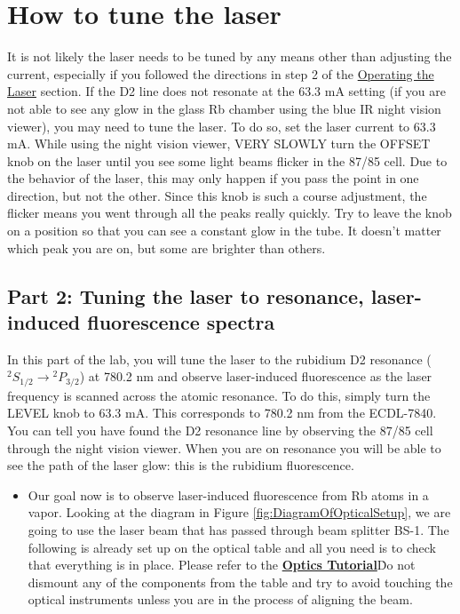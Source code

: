 \documentclass{../lab}
\begin{document}
\newpage

\section{How to tune the laser}

It is not likely the laser needs to be tuned by any means other than adjusting the current, especially if you followed the directions in step 2 of the \hyperref[subsubsec:OperatingTheLaser]{Operating the Laser} section. If the D2 line does not resonate at the 63.3 mA setting (if you are not able to see any glow in the glass Rb chamber using the blue IR night vision viewer), you may need to tune the laser. To do so, set the laser current to 63.3 mA. While using the night vision viewer, VERY SLOWLY turn the OFFSET knob on the laser until you see some light beams flicker in the 87/85 cell. Due to the behavior of the laser, this may only happen if you pass the point in one direction, but not the other. Since this knob is such a course adjustment, the flicker means you went through all the peaks really quickly. Try to leave the knob on a position so that you can see a constant glow in the tube. It doesn't matter which peak you are on, but some are brighter than others.

\subsection{Part 2: Tuning the laser to resonance, laser-induced fluorescence spectra}

In this part of the lab, you will tune the laser to the rubidium D2 resonance ($^2S_{1/2} \rightarrow {}^2P_{3/2}$)  at 780.2 nm and observe laser-induced fluorescence as the laser frequency is scanned across the atomic resonance. To do this, simply turn the LEVEL knob to 63.3 mA. This corresponds to 780.2 nm from the ECDL-7840. You can tell you have found the D2 resonance line by observing the 87/85 cell through the night vision viewer. When you are on resonance you will be able to see the path of the laser glow: this is the rubidium fluorescence.

\begin{itemize}
    \item Our goal now is to observe laser-induced fluorescence from Rb atoms in a vapor. Looking at the diagram in Figure \ref{fig:DiagramOfOpticalSetup}, we are going to use the laser beam that has passed through beam splitter BS-1. The following is already set up on the optical table and all you need is to check that everything is in place. Please refer to the \href{http://experimentationlab.berkeley.edu/OpticsTutorial}{\textbf{Optics Tutorial}}\. Do not dismount any of the components from the table and try to avoid touching the optical instruments unless you are in the process of aligning the beam.

\end{itemize}
\end{document}

